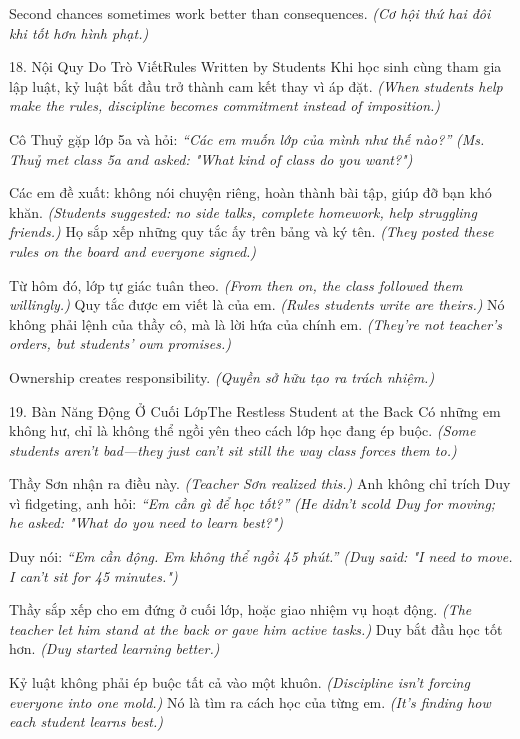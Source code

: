 \begin{ghinhoanh}
Second chances sometimes work better than consequences.
\textit{(Cơ hội thứ hai đôi khi tốt hơn hình phạt.)}
\end{ghinhoanh}

\begin{truyen}{18. Nội Quy Do Trò Viết}{Rules Written by Students}
Khi học sinh cùng tham gia lập luật, kỷ luật bắt đầu trở thành cam kết thay vì áp đặt.
\textit{(When students help make the rules, discipline becomes commitment instead of imposition.)}

Cô Thuỷ gặp lớp 5a và hỏi: \textit{``Các em muốn lớp của mình như thế nào?''}
\textit{(Ms. Thuỷ met class 5a and asked: "What kind of class do you want?")}

Các em đề xuất: không nói chuyện riêng, hoàn thành bài tập, giúp đỡ bạn khó khăn.
\textit{(Students suggested: no side talks, complete homework, help struggling friends.)}
Họ sắp xếp những quy tắc ấy trên bảng và ký tên.
\textit{(They posted these rules on the board and everyone signed.)}

Từ hôm đó, lớp tự giác tuân theo.
\textit{(From then on, the class followed them willingly.)}
Quy tắc được em viết là của em.
\textit{(Rules students write are theirs.)}
Nó không phải lệnh của thầy cô, mà là lời hứa của chính em.
\textit{(They're not teacher's orders, but students' own promises.)}
\end{truyen}

\begin{baihoc}
Ownership creates responsibility.
\textit{(Quyền sở hữu tạo ra trách nhiệm.)}
\end{baihoc}

\begin{truyen}{19. Bàn Năng Động Ở Cuối Lớp}{The Restless Student at the Back}
Có những em không hư, chỉ là không thể ngồi yên theo cách lớp học đang ép buộc.
\textit{(Some students aren't bad—they just can't sit still the way class forces them to.)}

Thầy Sơn nhận ra điều này.
\textit{(Teacher Sơn realized this.)}
Anh không chỉ trích Duy vì fidgeting, anh hỏi: \textit{``Em cần gì để học tốt?''}
\textit{(He didn't scold Duy for moving; he asked: "What do you need to learn best?")}

Duy nói: \textit{``Em cần động. Em không thể ngồi 45 phút.''}
\textit{(Duy said: "I need to move. I can't sit for 45 minutes.")}

Thầy sắp xếp cho em đứng ở cuối lớp, hoặc giao nhiệm vụ hoạt động.
\textit{(The teacher let him stand at the back or gave him active tasks.)}
Duy bắt đầu học tốt hơn.
\textit{(Duy started learning better.)}

Kỷ luật không phải ép buộc tất cả vào một khuôn.
\textit{(Discipline isn't forcing everyone into one mold.)}
Nó là tìm ra cách học của từng em.
\textit{(It's finding how each student learns best.)}
\end{truyen}

